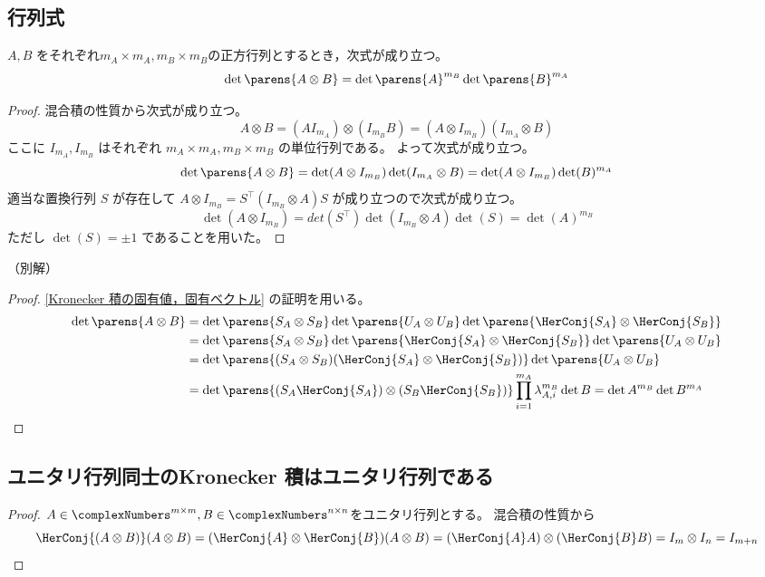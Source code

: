         \subsection{行列式}
            \begin{shadebox}
                $A,B$ をそれぞれ$m_A\times m_A, m_B\times m_B$の正方行列とするとき，次式が成り立つ。
                \[ \det\parens{A\otimes B} = \det\parens{A}^{m_B}\det\parens{B}^{m_A} \]
            \end{shadebox}
            \begin{proof}
                \quad\par
                混合積の性質から次式が成り立つ。
                \[ A\otimes B = (A I_{m_A})\otimes(I_{m_B} B) = (A\otimes I_{m_B})(I_{m_A}\otimes B) \]
                ここに $I_{m_A}, I_{m_B}$ はそれぞれ $m_A\times m_A, m_B\times m_B$ の単位行列である。
                よって次式が成り立つ。
                \[ \det\parens{A\otimes B} = \det(A\otimes I_{m_B})\det(I_{m_A}\otimes B) = \det(A\otimes I_{m_B})\det(B)^{m_A} \]
                適当な置換行列 $S$ が存在して $A\otimes I_{m_B} = S^\top(I_{m_B}\otimes A)S$ が成り立つので次式が成り立つ。
                \[ \det(A\otimes I_{m_B}) = det(S^\top)\det(I_{m_B}\otimes A)\det(S) = \det(A)^{m_B} \]
                ただし $\det(S) = \pm 1$ であることを用いた。
            \end{proof}
            （別解）
            \begin{proof}
                \quad\par
                \ref{Kronecker 積の固有値，固有ベクトル} の証明を用いる。
                \begin{align*}
                    \det\parens{A\otimes B} &= \det\parens{S_A\otimes S_B}\det\parens{U_A\otimes U_B}\det\parens{\HerConj{S_A}\otimes\HerConj{S_B}} \\
                    &= \det\parens{S_A\otimes S_B}\det\parens{\HerConj{S_A}\otimes\HerConj{S_B}}\det\parens{U_A\otimes U_B} \\
                    &= \det\parens{(S_A\otimes S_B)(\HerConj{S_A}\otimes\HerConj{S_B})}\det\parens{U_A\otimes U_B} \\
                    &= \det\parens{(S_A\HerConj{S_A})\otimes(S_B\HerConj{S_B})}\prod_{i=1}^{m_A} \lambda_{A,i}^{m_B}\det{B} = \det{A}^{m_B}\det{B}^{m_A}
                \end{align*}
            \end{proof}
        \subsection{ユニタリ行列同士のKronecker 積はユニタリ行列である}
            \begin{proof}
                \quad\par
                $A\in\complexNumbers^{m\times m}, B\in\complexNumbers^{n\times n}$をユニタリ行列とする。
                混合積の性質から
                \[
                    \HerConj{(A\otimes B)}(A\otimes B) = (\HerConj{A}\otimes \HerConj{B})(A\otimes B) = (\HerConj{A}A)\otimes(\HerConj{B}B) = I_m\otimes I_n = I_{m+n}
                \]
            \end{proof}